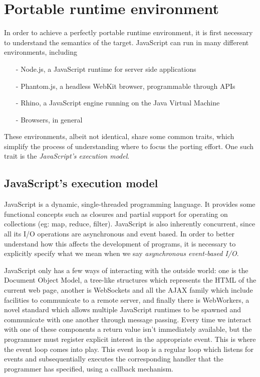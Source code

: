 \documentclass{sig-alternate}
\begin{document}
\section{Portable runtime environment}\label{sec:challenges}

In order to achieve a perfectly portable runtime environment, it is first necessary to understand the semantics of the target.
JavaScript can run in many different environments, including
\begin{itemize}
\item[-]{Node.js, a JavaScript runtime for server side applications}
\item[-]{Phantom.js, a headless WebKit browser, programmable through APIs}
\item[-]{Rhino, a JavaScript engine running on the Java Virtual Machine}
\item[-]{Browsers, in general}
\end{itemize}
These environments, albeit not identical, share some common traits, which simplify the process of understanding where to focus the porting effort. One such trait is the \textit{JavaScript's execution model}.

\subsection{JavaScript's execution model}

JavaScript is a dynamic, single-threaded programming language. It provides some functional concepts such as closures and partial support for operating on collections (eg: map, reduce, filter).
JavaScript is also inherently concurrent, since all its I/O operations are asynchronous and event based.
In order to better understand how this affects the development of programs, it is necessary to explicitly specify what we mean when we say \textit{asynchronous event-based I/O}.

JavaScript only has a few ways of interacting with the outside world: one is the Document Object Model, a tree-like structures which represents the HTML of the current web page, another is WebSockets and all the AJAX family which include facilities to communicate to a remote server, and finally there is WebWorkers, a novel standard which allows multiple JavaScript runtimes to be spawned and communicate with one another through message passing.
Every time we interact with one of these components a return value isn't immediately available, but the programmer must register explicit interest in the appropriate event. This is where the event loop comes into play. This event loop is a regular loop which listens for events and subsequentially executes the corresponding handler that the programmer has specified, using a callback mechanism.
\end{document}
